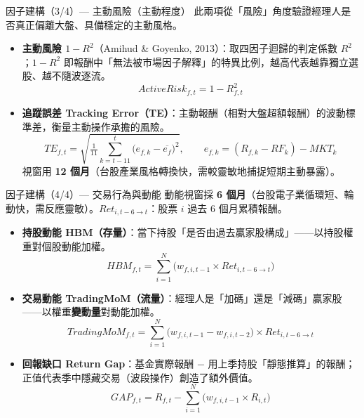 \documentclass[aspectratio=169,11pt,t]{beamer}   %
\begin{document}
\begin{frame}{因子建構（3/4）— 主動風險（主動程度）}
\vspace{0.1cm}\small
此兩項從「風險」角度驗證經理人是否真正偏離大盤、具備穩定的主動風格。
\begin{itemize}\setlength{\itemsep}{11pt}
  \item \textcolor{nccublue}{\textbf{主動風險 $1-R^2$}}（Amihud \& Goyenko, 2013）：取四因子迴歸的判定係數 $R^2$；$1-R^2$ 即報酬中「無法被市場因子解釋」的特異比例，越高代表越靠獨立選股、越不隨波逐流。
  \[ ActiveRisk_{f,t}=1-R^2_{f,t} \]
  \item \textcolor{nccublue}{\textbf{追蹤誤差 Tracking Error（TE）}}：主動報酬（相對大盤超額報酬）的波動標準差，衡量主動操作承擔的風險。
  \[ TE_{f,t}=\sqrt{\tfrac{1}{11}\sum_{k=t-11}^{t}\bigl(e_{f,k}-\overline{e_f}\bigr)^2},\qquad e_{f,k}=(R_{f,k}-RF_k)-MKT_k \]
  {\footnotesize\color{softgray} 視窗用 \textbf{12 個月}（台股產業風格轉換快，需較靈敏地捕捉短期主動暴露）。}
\end{itemize}
\end{frame}

\begin{frame}{因子建構（4/4）— 交易行為與動能}
\vspace{-0.15cm}\small
\setlength\abovedisplayskip{2pt}\setlength\belowdisplayskip{2pt}
動能視窗採 \textbf{6 個月}（台股電子業循環短、輪動快，需反應靈敏）。$Ret_{i,t-6\to t}$：股票 $i$ 過去 6 個月累積報酬。
\begin{itemize}\setlength{\itemsep}{2pt}
  \item \textcolor{nccublue}{\textbf{持股動能 HBM（存量）}}：當下持股「是否由過去贏家股構成」——以持股權重對個股動能加權。
  \[ HBM_{f,t}=\sum_{i=1}^{N}\bigl(w_{f,i,t-1}\times Ret_{i,t-6\to t}\bigr) \]
  \item \textcolor{nccublue}{\textbf{交易動能 TradingMoM（流量）}}：經理人是「加碼」還是「減碼」贏家股——以權重\textbf{變動量}對動能加權。
  \[ TradingMoM_{f,t}=\sum_{i=1}^{N}\bigl(w_{f,i,t-1}-w_{f,i,t-2}\bigr)\times Ret_{i,t-6\to t} \]
  \item \textcolor{nccublue}{\textbf{回報缺口 Return Gap}}：基金實際報酬 $-$ 用上季持股「靜態推算」的報酬；正值代表季中隱藏交易（波段操作）創造了額外價值。
  \[ GAP_{f,t}=R_{f,t}-\sum_{i=1}^{N}\bigl(w_{f,i,t-1}\times R_{i,t}\bigr) \]
\end{itemize}
\end{frame}
\end{document}
